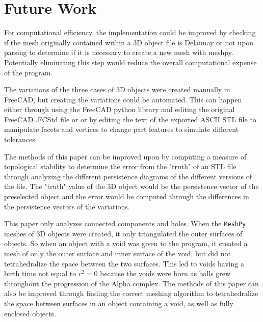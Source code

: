 \documentclass[ma]{uncgdissertationexp}
\theoremstyle{plain}
\theoremstyle{definition}
\theoremstyle{remark}
\begin{document}
\section{Future Work}
\par For computational efficiency, the implementation could be improved by checking if the mesh originally contained within a 3D object file is Delaunay or not upon parsing to determine if it is necessary to create a new mesh with meshpy. Potentially eliminating this step would reduce the overall computational expense of the program.
\par The variations of the three cases of 3D objects were created manually in FreeCAD, but creating the variations could be automated. This can happen either through using the FreeCAD python library and editing the original FreeCAD .FCStd file or or by editing the text of the exported ASCII STL file to manipulate facets and vertices to change part features to simulate different tolerances.
\par The methods of this paper can be improved upon by computing a measure of topological stability to determine the error from the "truth" of an STL file through analyzing the different persistence diagrams of the different versions of the file. The "truth" value of the 3D object would be the persistence vector of the preselected object and the error would be computed through the differences in the persistence vectors of the variations.
\par This paper only analyzes connected components and holes. When the \verb"MeshPy" meshes of 3D objects were created, it only triangulated the outer surfaces of objects. So when an object with a void was given to the program, it created a mesh of only the outer surface and inner surface of the void, but did not tetrahedralize the space between the two surfaces. This led to voids having a birth time not equal to $r^{2}=0$ because the voids were born as balls grew throughout the progression of the Alpha complex. The methods of this paper can also be improved through finding the correct meshing algorithm to tetrahedralize the space between surfaces in an object containing a void, as well as fully enclosed objects.



\backmatter
\end{document}
